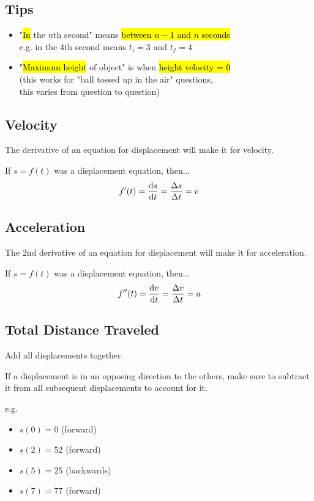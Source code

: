 \documentclass[a4paper,12pt]{article}
\begin{document}
\subsection{Tips}
\begin{itemize}
    \item{"\hl{In} the $n$th second" means \hl{between $n-1$ and $n$ seconds}\\e.g. in the 4th second means $t_i = 3$ and $t_f = 4$}
    \item{"\hl{Maximum height} of object" is when \hl{height velocity = 0} \\(this works for "ball tossed up in the air" questions, \\this varies from question to question)}
\end{itemize}

\subsection{Velocity}
The derivative of an equation for displacement will make it for velocity.

If $s = f(t)$ was a displacement equation, then...
$$f'(t) = \dv{s}{t} = \frac{\Delta{s}}{\Delta{t}} = v$$

\subsection{Acceleration}
The 2nd derivative of an equation for displacement will make it for acceleration.

If $s = f(t)$ was a displacement equation, then...
$$f''(t) = \dv{v}{t} = \frac{\Delta{v}}{\Delta{t}} = a$$

\subsection{Total Distance Traveled}
Add all displacements together.

If a displacement is in an opposing direction to the others, make sure to subtract it from all subsequent displacements to account for it.

e.g.
\begin{itemize}
    \item{$s(0) = 0$ (forward)}
    \item{$s(2) = 52$ (forward)}
    \item{$s(5) = 25$ (backwards)}
    \item{$s(7) = 77$ (forward)}
\end{itemize}
\end{document}
